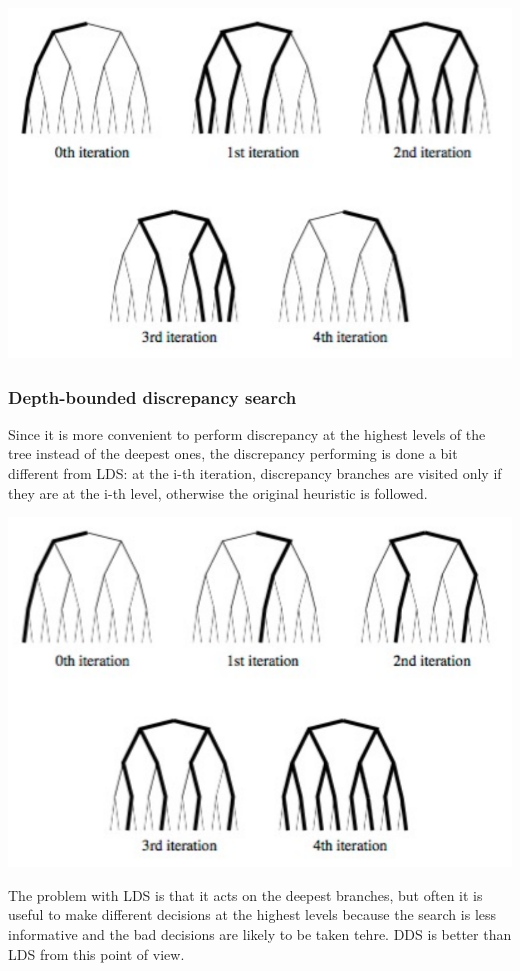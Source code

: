 \documentclass[10pt,a4paper]{article}
\begin{document}
\includegraphics[scale=0.25]{lds.png}

\subsubsection{Depth-bounded discrepancy search}
Since it is more convenient to perform discrepancy at the highest levels of the
tree instead of the deepest ones, the discrepancy performing is done a bit
different from LDS: at the i-th iteration, discrepancy branches are visited only
if they are at the i-th level, otherwise the original heuristic is followed.

\includegraphics[scale=0.25]{dds.png}

The problem with LDS is that it acts on the deepest branches, but often it is
useful to make different decisions at the highest levels because the search is
less informative and the bad decisions are likely to be taken tehre. DDS is
better than LDS from this point of view.
\end{document}
